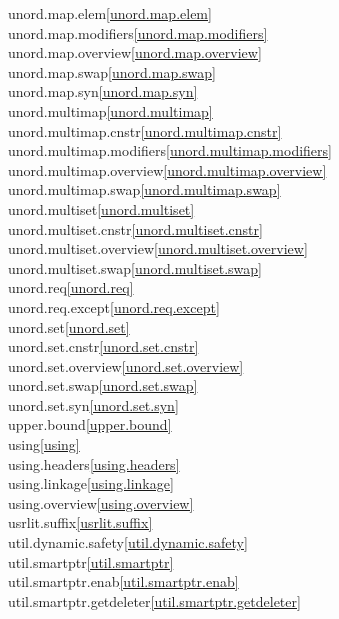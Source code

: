 \begin{multicols}{2}
unord.map.elem\quad\ref{unord.map.elem}\\
unord.map.modifiers\quad\ref{unord.map.modifiers}\\
unord.map.overview\quad\ref{unord.map.overview}\\
unord.map.swap\quad\ref{unord.map.swap}\\
unord.map.syn\quad\ref{unord.map.syn}\\
unord.multimap\quad\ref{unord.multimap}\\
unord.multimap.cnstr\quad\ref{unord.multimap.cnstr}\\
unord.multimap.modifiers\quad\ref{unord.multimap.modifiers}\\
unord.multimap.overview\quad\ref{unord.multimap.overview}\\
unord.multimap.swap\quad\ref{unord.multimap.swap}\\
unord.multiset\quad\ref{unord.multiset}\\
unord.multiset.cnstr\quad\ref{unord.multiset.cnstr}\\
unord.multiset.overview\quad\ref{unord.multiset.overview}\\
unord.multiset.swap\quad\ref{unord.multiset.swap}\\
unord.req\quad\ref{unord.req}\\
unord.req.except\quad\ref{unord.req.except}\\
unord.set\quad\ref{unord.set}\\
unord.set.cnstr\quad\ref{unord.set.cnstr}\\
unord.set.overview\quad\ref{unord.set.overview}\\
unord.set.swap\quad\ref{unord.set.swap}\\
unord.set.syn\quad\ref{unord.set.syn}\\
upper.bound\quad\ref{upper.bound}\\
using\quad\ref{using}\\
using.headers\quad\ref{using.headers}\\
using.linkage\quad\ref{using.linkage}\\
using.overview\quad\ref{using.overview}\\
usrlit.suffix\quad\ref{usrlit.suffix}\\
util.dynamic.safety\quad\ref{util.dynamic.safety}\\
util.smartptr\quad\ref{util.smartptr}\\
util.smartptr.enab\quad\ref{util.smartptr.enab}\\
util.smartptr.getdeleter\quad\ref{util.smartptr.getdeleter}\\

\end{multicols}
